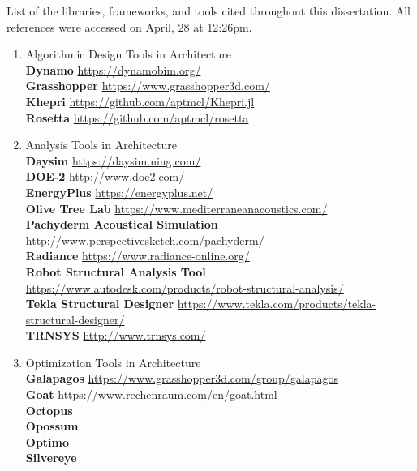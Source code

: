 List of the libraries, frameworks, and tools cited throughout this dissertation. All references were accessed on April, 28 at 12:26pm.
\begin{enumerate}[label=\Alph*]
\item Algorithmic Design Tools in Architecture \\
\textbf{Dynamo} \url{https://dynamobim.org/} \\
\textbf{Grasshopper} \url{https://www.grasshopper3d.com/} \\ 
\textbf{Khepri} \url{https://github.com/aptmcl/Khepri.jl} \\
\textbf{Rosetta} \url{https://github.com/aptmcl/rosetta} 

\item Analysis Tools in Architecture \\
\textbf{Daysim} \url{https://daysim.ning.com/} \\
\textbf{DOE-2} \url{http://www.doe2.com/} \\
\textbf{EnergyPlus} \url{https://energyplus.net/} \\
\textbf{Olive Tree Lab} \url{https://www.mediterraneanacoustics.com/} \\
\textbf{Pachyderm Acoustical Simulation} \url{http://www.perspectivesketch.com/pachyderm/} \\
\textbf{Radiance} \url{https://www.radiance-online.org/} \\
\textbf{Robot Structural Analysis Tool} \url{https://www.autodesk.com/products/robot-structural-analysis/} \\
\textbf{Tekla Structural Designer} \url{https://www.tekla.com/products/tekla-structural-designer/} \\
\textbf{TRNSYS} \url{http://www.trnsys.com/} 

\item Optimization Tools in Architecture \\
\textbf{Galapagos} \url{https://www.grasshopper3d.com/group/galapagos} \\
\textbf{Goat} \url{https://www.rechenraum.com/en/goat.html} \\ 
\textbf{Octopus} \cite{OCTOPUS} \\
\textbf{Opossum}  \cite{Wortmann2017Opossum} \\
\textbf{Optimo} \cite{OPTIMO} \\
\textbf{Silvereye} \cite{Cichocka2017SILVEREYE} \\


\end{enumerate}
